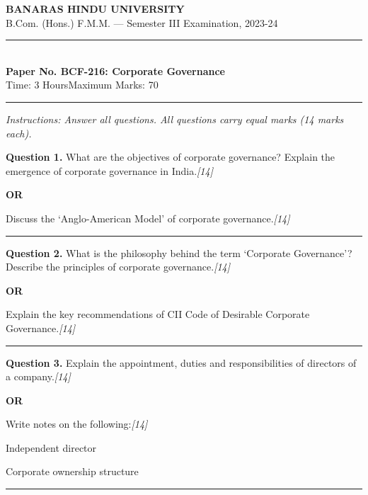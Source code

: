 \documentclass[11pt,a4paper]{article}
\newcommand{\pts}[1]{\hfill   \textit{[#1]}}
\begin{document}
\begin{center}
  {\large\bfseries BANARAS HINDU UNIVERSITY}\\[2pt]
  {\normalsize B.Com. (Hons.) F.M.M. --- Semester III Examination, 2023-24}\\[6pt]
  \rule{0.8\linewidth}{0.5pt}\\[6pt]
  {\large\bfseries Paper No. BCF-216: Corporate Governance}\\[4pt]
  {\normalsize Time: 3 Hours\hfill Maximum Marks: 70}
\end{center}

\rule{\linewidth}{0.4pt}

\smallskip



\noindent   \textit{Instructions: Answer all questions. All questions carry equal marks (14 marks each).}

\bigskip




\noindent   \textbf{Question 1.}
What are the objectives of corporate governance? Explain the emergence of corporate governance in India.\pts{14}

\centerline{   \textbf{OR}}

Discuss the `Anglo-American Model' of corporate governance.\pts{14}

\medskip\rule{\linewidth}{0.2pt}




\noindent   \textbf{Question 2.}
What is the philosophy behind the term `Corporate Governance'? Describe the principles of corporate governance.\pts{14}

\centerline{   \textbf{OR}}

Explain the key recommendations of CII Code of Desirable Corporate Governance.\pts{14}

\medskip\rule{\linewidth}{0.2pt}




\noindent   \textbf{Question 3.}
Explain the appointment, duties and responsibilities of directors of a company.\pts{14}

\centerline{   \textbf{OR}}

Write notes on the following:\pts{14}

\begin{parts}
  \item Independent director
  \item Corporate ownership structure
\end{parts}

\medskip\rule{\linewidth}{0.2pt}
\end{document}
